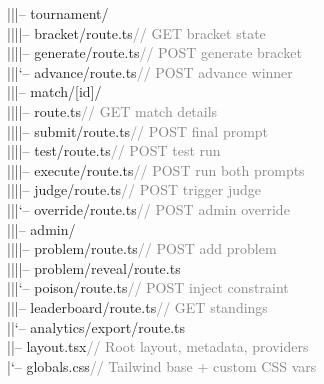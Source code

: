 \documentclass[11pt, a4paper]{article}
\begin{document}
\begin{tcolorbox}[codebox]
\textcolor{codeblue}{|\quad |\quad |--} tournament/\\
\textcolor{codeblue}{|\quad |\quad |\quad |--} bracket/route.ts\textcolor{gray}{\quad// GET bracket state}\\
\textcolor{codeblue}{|\quad |\quad |\quad |--} generate/route.ts\textcolor{gray}{\quad// POST generate bracket}\\
\textcolor{codeblue}{|\quad |\quad |\quad `--} advance/route.ts\textcolor{gray}{\quad// POST advance winner}\\
\textcolor{codeblue}{|\quad |\quad |--} match/[id]/\\
\textcolor{codeblue}{|\quad |\quad |\quad |--} route.ts\textcolor{gray}{\quad\quad\quad\quad\quad// GET match details}\\
\textcolor{codeblue}{|\quad |\quad |\quad |--} submit/route.ts\textcolor{gray}{\quad// POST final prompt}\\
\textcolor{codeblue}{|\quad |\quad |\quad |--} test/route.ts\textcolor{gray}{\quad\quad// POST test run}\\
\textcolor{codeblue}{|\quad |\quad |\quad |--} execute/route.ts\textcolor{gray}{\quad// POST run both prompts}\\
\textcolor{codeblue}{|\quad |\quad |\quad |--} judge/route.ts\textcolor{gray}{\quad\quad// POST trigger judge}\\
\textcolor{codeblue}{|\quad |\quad |\quad `--} override/route.ts\textcolor{gray}{\quad// POST admin override}\\
\textcolor{codeblue}{|\quad |\quad |--} admin/\\
\textcolor{codeblue}{|\quad |\quad |\quad |--} problem/route.ts\textcolor{gray}{\quad// POST add problem}\\
\textcolor{codeblue}{|\quad |\quad |\quad |--} problem/reveal/route.ts\\
\textcolor{codeblue}{|\quad |\quad |\quad `--} poison/route.ts\textcolor{gray}{\quad// POST inject constraint}\\
\textcolor{codeblue}{|\quad |\quad |--} leaderboard/route.ts\textcolor{gray}{\quad// GET standings}\\
\textcolor{codeblue}{|\quad |\quad `--} analytics/export/route.ts\\
\textcolor{codeblue}{|\quad |--} layout.tsx\textcolor{gray}{\quad\quad\quad\quad\quad\quad\quad\quad\quad\quad// Root layout, metadata, providers}\\
\textcolor{codeblue}{|\quad `--} globals.css\textcolor{gray}{\quad\quad\quad\quad\quad\quad\quad\quad\quad// Tailwind base + custom CSS vars}\\
\end{tcolorbox}
\end{document}
